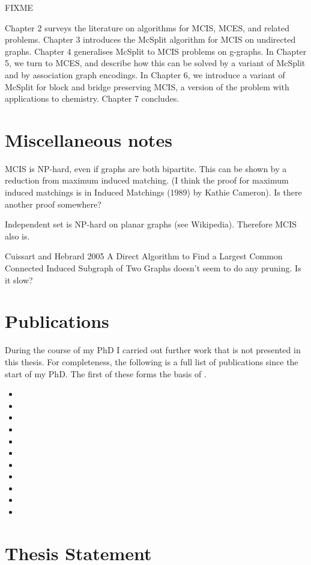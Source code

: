 FIXME

Chapter 2 surveys the literature on algorithms for MCIS, MCES, and related
problems. Chapter 3 introduces the McSplit algorithm for MCIS on undirected
graphs. Chapter 4 generalises McSplit to MCIS problems on g-graphs. In Chapter
5, we turn to MCES, and describe how this can be solved by a variant of McSplit
and by association graph encodings. In Chapter 6, we introduce a variant of
McSplit for block and bridge preserving MCIS, a version of the problem with
applications to chemistry. Chapter 7 concludes.

\section{Miscellaneous notes}

MCIS is NP-hard, even if graphs are both bipartite.  This can be shown by a
reduction from maximum induced matching.  (I think the proof for maximum induced
matchings is in Induced Matchings (1989) by Kathie Cameron). Is there another
proof somewhere?

Independent set is NP-hard on planar graphs (see Wikipedia).  Therefore
MCIS also is.

Cuissart and Hebrard 2005 A Direct Algorithm to Find a Largest Common
Connected Induced Subgraph of Two Graphs doesn't seem to do any
pruning.  Is it slow?

\section{Publications}

During the course of my PhD I carried out further work
that is not presented in this thesis.
For completeness, the following is a full list of publications
since the start of my PhD.  The first of these
forms the basis of .

\begin{itemize}
    \item{}
    \item{}
    \item{}
    \item{}
    \item{}
    \item{}
    \item{}
    \item{}
    \item{}
    \item{}
    \item{}
\end{itemize}

\section{Thesis Statement}
\label{c:intro:thesisstatement}


